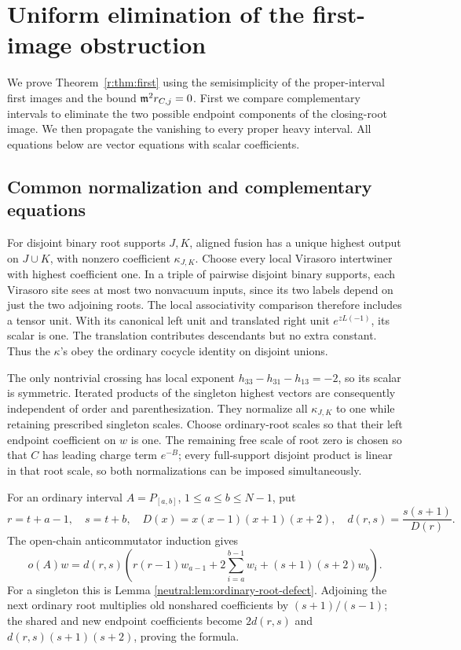 \documentclass[11pt,a4paper]{article}
\numberwithin{equation}{section}
\theoremstyle{definition}\newtheorem{definition}[theorem]{Definition}
\theoremstyle{remark}\newtheorem{remark}[theorem]{Remark}
\begin{document}
\section{Uniform elimination of the first-image obstruction}
\label{r:app:first}

We prove Theorem~\ref{r:thm:first} using the semisimplicity of the
proper-interval first images and the bound \(\mathfrak m^2r_{C,j}=0\).
First we compare complementary intervals to eliminate the two
possible endpoint components of the closing-root image.  We then
propagate the vanishing to every proper heavy interval.
All equations below are vector equations with scalar coefficients.

\subsection{Common normalization and complementary equations}

For disjoint binary root supports \(J,K\), aligned fusion has a
unique highest output on \(J\cup K\), with nonzero coefficient
\(\kappa_{J,K}\). Choose every local Virasoro intertwiner with
highest coefficient one. In a triple of pairwise disjoint binary
supports, each Virasoro site sees at most two nonvacuum inputs,
since its two labels depend on just the two adjoining roots.
The local associativity comparison therefore includes a tensor
unit. With its canonical left unit and translated right unit
\(e^{zL(-1)}\), its scalar is one. The translation contributes
descendants but no extra constant. Thus the \(\kappa\)'s obey
the ordinary cocycle identity on disjoint unions.

The only nontrivial crossing has local exponent
\(h_{33}-h_{31}-h_{13}=-2\), so its scalar is symmetric.
Iterated products of the singleton highest vectors are consequently
independent of order and parenthesization. They normalize all
\(\kappa_{J,K}\) to one while retaining prescribed singleton scales.
Choose ordinary-root scales so that their left endpoint coefficient
on \(w\) is one. The remaining free scale of root zero is chosen
so that \(C\) has leading charge term \(e^{-B}\); every full-support
disjoint product is linear in that root scale, so both normalizations
can be imposed simultaneously.

For an ordinary interval \(A=P_{[a,b]}\), \(1\le a\le b\le N-1\),
put
\[
 r=t+a-1,\quad s=t+b,\quad
 D(x)=x(x-1)(x+1)(x+2),\quad d(r,s)=\frac{s(s+1)}{D(r)}.
\]
The open-chain anticommutator induction gives
\begin{equation}\label{r:eq:ordinaryclosed}
 o(A)w=d(r,s)\left(r(r-1)w_{a-1}
                +2\sum_{i=a}^{b-1}w_i+(s+1)(s+2)w_b\right).
\end{equation}
For a singleton this is Lemma \ref{neutral:lem:ordinary-root-defect}. Adjoining the
next ordinary root multiplies old nonshared coefficients by
\((s+1)/(s-1)\); the shared and new endpoint coefficients become
\(2d(r,s)\) and \(d(r,s)(s+1)(s+2)\), proving the formula.
\end{document}
